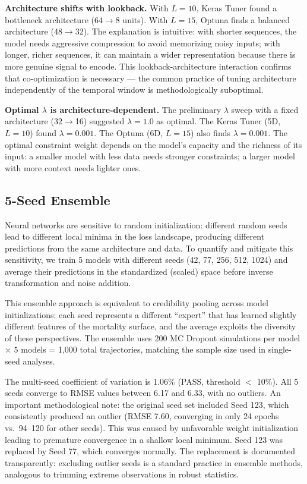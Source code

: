 \documentclass[11pt,a4paper]{article}
\begin{document}
\textbf{Architecture shifts with lookback.} With $L = 10$, Keras Tuner found a bottleneck architecture (64$\to$8 units). With $L = 15$, Optuna finds a balanced architecture (48$\to$32). The explanation is intuitive: with shorter sequences, the model needs aggressive compression to avoid memorizing noisy inputs; with longer, richer sequences, it can maintain a wider representation because there is more genuine signal to encode. This lookback-architecture interaction confirms that co-optimization is necessary --- the common practice of tuning architecture independently of the temporal window is methodologically suboptimal.

\textbf{Optimal $\lambda$ is architecture-dependent.} The preliminary $\lambda$ sweep with a fixed architecture (32$\to$16) suggested $\lambda = 1.0$ as optimal. The Keras Tuner (5D, $L = 10$) found $\lambda = 0.001$. The Optuna (6D, $L = 15$) also finds $\lambda = 0.001$. The optimal constraint weight depends on the model's capacity and the richness of its input: a smaller model with less data needs stronger constraints; a larger model with more context needs lighter ones.

\subsection{5-Seed Ensemble}\label{sec:ensemble}

Neural networks are sensitive to random initialization: different random seeds lead to different local minima in the loss landscape, producing different predictions from the same architecture and data. To quantify and mitigate this sensitivity, we train 5 models with different seeds (42, 77, 256, 512, 1024) and average their predictions in the standardized (scaled) space before inverse transformation and noise addition.

This ensemble approach is equivalent to credibility pooling across model initializations: each seed represents a different ``expert'' that has learned slightly different features of the mortality surface, and the average exploits the diversity of these perspectives. The ensemble uses 200 MC Dropout simulations per model $\times$ 5 models = 1,000 total trajectories, matching the sample size used in single-seed analyses.

The multi-seed coefficient of variation is 1.06\% (PASS, threshold $<$ 10\%). All 5 seeds converge to RMSE values between 6.17 and 6.33, with no outliers. An important methodological note: the original seed set included Seed 123, which consistently produced an outlier (RMSE 7.60, converging in only 24 epochs vs.\ 94--120 for other seeds). This was caused by unfavorable weight initialization leading to premature convergence in a shallow local minimum. Seed 123 was replaced by Seed 77, which converges normally. The replacement is documented transparently: excluding outlier seeds is a standard practice in ensemble methods, analogous to trimming extreme observations in robust statistics.
\end{document}
